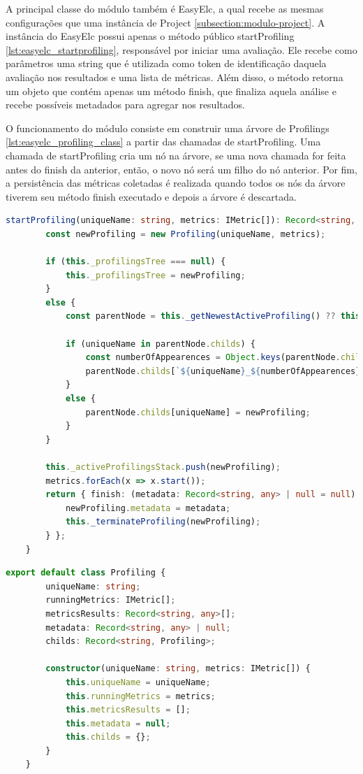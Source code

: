 \documentclass[12pt]{tcc}
\begin{document}
	A principal classe do módulo também é EasyElc, a qual recebe as mesmas configurações que uma instância de Project \ref{subsection:modulo-project}.
	A instância do EasyElc possui apenas o método público startProfiling \ref{lst:easyelc_startprofiling}, responsável por iniciar uma avaliação.
	Ele recebe como parâmetros uma string que é utilizada como token de identificação daquela avaliação nos resultados e uma lista de métricas.
	Além disso, o método retorna um objeto que contém apenas um método finish, que finaliza aquela análise e recebe possíveis metadados para agregar nos resultados.

	O funcionamento do módulo consiste em construir uma árvore de Profilings \ref{lst:easyelc_profiling_class} a partir das chamadas de startProfiling.
	Uma chamada de startProfiling cria um nó na árvore, se uma nova chamada for feita antes do finish da anterior, então, o novo nó será um filho do nó anterior.
	Por fim, a persistência das métricas coletadas é realizada quando todos os nós da árvore tiverem seu método finish executado e depois a árvore é descartada.

	\begin{lstlisting}[label={lst:easyelc_startprofiling}, caption={Implementação do método startProfiling da classe EasyElc.}, language=TypeScript, breaklines=true]
	startProfiling(uniqueName: string, metrics: IMetric[]): Record<string, any> {
		const newProfiling = new Profiling(uniqueName, metrics);

		if (this._profilingsTree === null) {
			this._profilingsTree = newProfiling;
		}
		else {
			const parentNode = this._getNewestActiveProfiling() ?? this._profilingsTree;

			if (uniqueName in parentNode.childs) {
				const numberOfAppearences = Object.keys(parentNode.childs).filter(k => k.match(new RegExp(`^${uniqueName}(\$|_[0-9]{1,}\$`))).length
				parentNode.childs[`${uniqueName}_${numberOfAppearences}`] = newProfiling;
			}
			else {
				parentNode.childs[uniqueName] = newProfiling;
			}
		}
		
		this._activeProfilingsStack.push(newProfiling);
		metrics.forEach(x => x.start());
		return { finish: (metadata: Record<string, any> | null = null) => {
			newProfiling.metadata = metadata;
			this._terminateProfiling(newProfiling);
		} };
	}
	\end{lstlisting}

	\begin{lstlisting}[label={lst:easyelc_profiling_class}, caption={Implementação do nó da árvore de análises usado no EasyElc.}, language=TypeScript, breaklines=true]
	export default class Profiling {
		uniqueName: string;
		runningMetrics: IMetric[];
		metricsResults: Record<string, any>[];
		metadata: Record<string, any> | null;
		childs: Record<string, Profiling>;

		constructor(uniqueName: string, metrics: IMetric[]) {
			this.uniqueName = uniqueName;
			this.runningMetrics = metrics;
			this.metricsResults = [];
			this.metadata = null;
			this.childs = {};
		}
	}
	\end{lstlisting}
\end{document}
